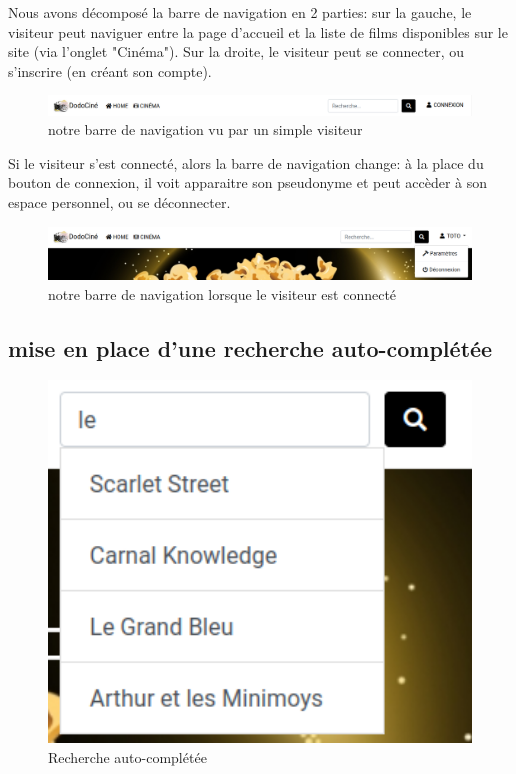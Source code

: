         Nous avons décomposé la barre de navigation en 2 parties: sur la gauche, le visiteur peut naviguer entre la page d'accueil et la liste de films disponibles sur le site (via l'onglet "Cinéma"). Sur la droite, le visiteur peut se connecter, ou s'inscrire (en créant son compte). 

        \begin{figure}[!ht]
            \centering
            \includegraphics[width=16cm]{img/navigation.png}
            \caption{notre barre de navigation vu par un simple visiteur}
        \end{figure}

        Si le visiteur s'est connecté, alors la barre de navigation change: à la place du bouton de connexion, il voit apparaitre son pseudonyme et peut accèder à son espace personnel, ou se déconnecter.

        \begin{figure}[!ht]
            \centering
            \includegraphics[width=16cm]{img/navigation-connect.png}
            \caption{notre barre de navigation lorsque le visiteur est connecté}
        \end{figure}


        \subsection{mise en place d'une recherche auto-complétée}

        \begin{figure}[!ht]
            \centering
            \includegraphics[width=16cm]{img/recherche-auto.png}
            \caption{Recherche auto-complétée}
        \end{figure}

